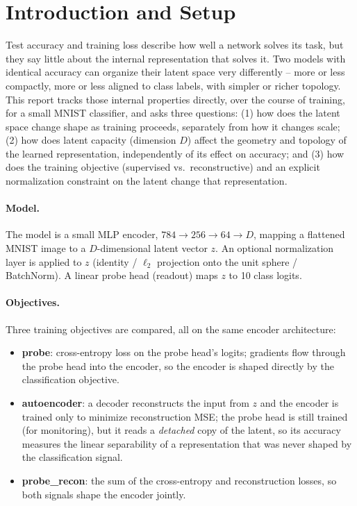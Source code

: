 \documentclass[11pt]{article}
\begin{document}
\section{Introduction and Setup}

Test accuracy and training loss describe how well a network solves its task,
but they say little about the internal representation that solves it. Two
models with identical accuracy can organize their latent space very
differently -- more or less compactly, more or less aligned to class labels,
with simpler or richer topology. This report tracks those internal
properties directly, over the course of training, for a small MNIST
classifier, and asks three questions: (1) how does the latent space change
shape as training proceeds, separately from how it changes scale; (2) how
does latent capacity (dimension $D$) affect the geometry and topology of the
learned representation, independently of its effect on accuracy; and (3) how
does the training objective (supervised vs.\ reconstructive) and an explicit
normalization constraint on the latent change that representation.

\paragraph{Model.} The model is a small MLP encoder, $784 \to 256 \to 64 \to
D$, mapping a flattened MNIST image to a $D$-dimensional latent vector $z$.
An optional normalization layer is applied to $z$ (identity / $\ell_2$
projection onto the unit sphere / BatchNorm). A linear probe head (readout)
maps $z$ to 10 class logits.

\paragraph{Objectives.} Three training objectives are compared, all on the
same encoder architecture:
\begin{itemize}
  \item \textbf{probe}: cross-entropy loss on the probe head's logits;
        gradients flow through the probe head into the encoder, so the
        encoder is shaped directly by the classification objective.
  \item \textbf{autoencoder}: a decoder reconstructs the input from $z$ and
        the encoder is trained only to minimize reconstruction MSE; the
        probe head is still trained (for monitoring), but it reads a
        \emph{detached} copy of the latent, so its accuracy measures the
        linear separability of a representation that was never shaped by
        the classification signal.
  \item \textbf{probe\_recon}: the sum of the cross-entropy and
        reconstruction losses, so both signals shape the encoder jointly.
\end{itemize}
\end{document}

